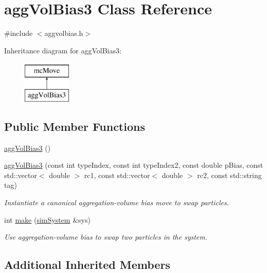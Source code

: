 \hypertarget{classagg_vol_bias3}{\section{agg\-Vol\-Bias3 Class Reference}
\label{classagg_vol_bias3}
}


{\ttfamily \#include $<$aggvolbias.\-h$>$}

Inheritance diagram for agg\-Vol\-Bias3\-:\begin{figure}[H]
\begin{center}
\leavevmode
\includegraphics[height=2.000000cm]{classagg_vol_bias3}
\end{center}
\end{figure}
\subsection*{Public Member Functions}
\begin{DoxyCompactItemize}
\item 
\hyperlink{classagg_vol_bias3_a6fd174822857506eb4c61833ba6697ef}{agg\-Vol\-Bias3} ()
\item 
\hyperlink{classagg_vol_bias3_ac6a23cf87ba65eb6dba8f6512f0d7c78}{agg\-Vol\-Bias3} (const int type\-Index, const int type\-Index2, const double p\-Bias, const std\-::vector$<$ double $>$ rc1, const std\-::vector$<$ double $>$ rc2, const std\-::string tag)
\begin{DoxyCompactList}\small\item\em Instantiate a canonical aggregation-\/volume bias move to swap particles. \end{DoxyCompactList}\item 
int \hyperlink{classagg_vol_bias3_a59ebf724c8af1921045710fe9a08dd01}{make} (\hyperlink{classsim_system}{sim\-System} \&sys)
\begin{DoxyCompactList}\small\item\em Use aggregation-\/volume bias to swap two particles in the system. \end{DoxyCompactList}\end{DoxyCompactItemize}
\subsection*{Additional Inherited Members}


